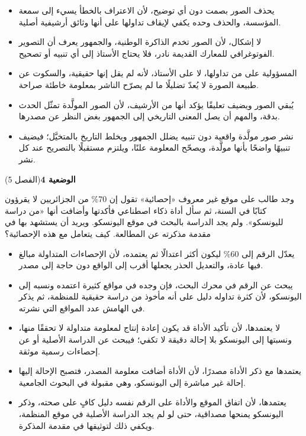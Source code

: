 \documentclass[11pt,a4paper]{article}
\begin{document}
\begin{itemize}[leftmargin=1.0cm, labelsep=6pt, itemsep=3pt, topsep=4pt, parsep=0pt]
  \item[\textbf{أ)}] يحذف الصور بصمت دون أي توضيح، لأن الاعتراف بالخطأ يسيء إلى سمعة المؤسسة، والحذف وحده يكفي لإيقاف تداولها على أنها وثائق أرشيفية أصلية.
  \item[\textbf{ب)}] لا إشكال، لأن الصور تخدم الذاكرة الوطنية، والجمهور يعرف أن التصوير الفوتوغرافي للمعارك القديمة نادر، فلا يحتاج الأستاذ إلى أي تنبيه أو تصحيح.
  \item[\textbf{ج)}] المسؤولية على من تداولها، لا على الأستاذ، لأنه لم يقل إنها حقيقية، والسكوت عن طبيعة الصورة لا يُعدّ تضليلًا ما لم يصرّح الناشر بمعلومة خاطئة صراحة.
  \item[\textbf{د)}] يُبقي الصور ويضيف تعليقًا يؤكد أنها من الأرشيف، لأن الصور المولَّدة تمثّل الحدث بدقة، والمهم أن يصل المعنى التاريخي إلى الجمهور بغض النظر عن مصدرها.
  \item[\textbf{هـ)}] نشر صور مولَّدة واقعية دون تنبيه يضلل الجمهور ويخلط التاريخ بالمتخيَّل؛ فيضيف تنبيهًا واضحًا بأنها مولَّدة، ويصحّح المعلومة علنًا، ويلتزم مستقبلًا بالتصريح عند كل نشر.
\end{itemize}
\par\vspace{6pt}
\noindent
{\large\khatt\textbf{الوضعية 4}}\hfill{\small(الفصل 5)}\par\nopagebreak\vspace{3pt}
\setlength{\fboxsep}{7pt}\colorbox{gray!10}{\parbox{\dimexpr\linewidth-14pt}{وجد طالب على موقع غير معروف «إحصائية» تقول إن 70\% من الجزائريين لا يقرؤون كتابًا في السنة، ثم سأل أداة ذكاء اصطناعي فأكدتها وأضافت أنها «من دراسة لليونسكو». ولم يجد الدراسة بالبحث في موقع اليونسكو. ويريد أن يستشهد بها في مقدمة مذكرته عن المطالعة. كيف يتعامل مع هذه الإحصائية؟}}\par\nopagebreak
\begin{itemize}[leftmargin=1.0cm, labelsep=6pt, itemsep=3pt, topsep=4pt, parsep=0pt]
  \item[\textbf{أ)}] يعدّل الرقم إلى 60\% ليكون أكثر اعتدالًا ثم يعتمده، لأن الإحصاءات المتداولة مبالغ فيها عادة، والتعديل الحذر يجعلها أقرب إلى الواقع دون حاجة إلى مصدر.
  \item[\textbf{ب)}] يبحث عن الرقم في محرك البحث، فإن وجده في مواقع كثيرة اعتمده ونسبه إلى اليونسكو، لأن كثرة تداوله دليل على أنه مأخوذ من دراسة حقيقية للمنظمة، ثم يذكر في الهامش عدد المواقع التي نشرته.
  \item[\textbf{ج)}] لا يعتمدها، لأن تأكيد الأداة قد يكون إعادة إنتاج لمعلومة متداولة لا تحققًا منها، ونسبتها إلى اليونسكو بلا إحالة دقيقة لا تكفي؛ فيبحث عن الدراسة الأصلية أو عن إحصاءات رسمية موثقة.
  \item[\textbf{د)}] يعتمدها مع ذكر الأداة مصدرًا، لأن الأداة أضافت معلومة المصدر، فتصبح الإحالة إليها إحالة غير مباشرة إلى اليونسكو، وهي مقبولة في البحوث الجامعية.
  \item[\textbf{هـ)}] يعتمدها، لأن اتفاق الموقع والأداة على الرقم نفسه دليل كافٍ على صحته، وذكر اليونسكو يمنحها مصداقية، حتى لو لم يجد الدراسة الأصلية في موقع المنظمة، ويكفي ذلك لتوثيقها في مقدمة المذكرة.
\end{itemize}
\end{document}
